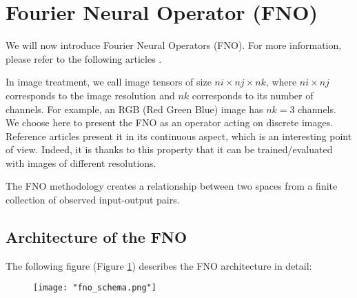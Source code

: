 \section{Fourier Neural Operator (FNO)} \label{FNO}
\graphicspath{{images/fourier}}


We will now introduce Fourier Neural Operators (FNO). For more information, please refer to the following articles .


In image treatment, we call image tensors of size $ni\times nj\times nk$, where $ni\times nj$ corresponds to the image resolution and $nk$ corresponds to its number of channels. For example, an RGB (Red Green Blue) image has $nk=3$ channels. 
We choose here to present the FNO as an operator acting on discrete images. Reference articles present it in its continuous aspect, which is an interesting point of view. Indeed, it is thanks to this property that it can be trained/evaluated with images of different resolutions.

The FNO methodology creates a relationship between two spaces from a finite collection of observed input-output pairs. 

\subsection{Architecture of the FNO}


The following figure (Figure \ref{FNO_schema}) describes the FNO architecture in detail:

\begin{figure}[H]
	\texttt{[image: "fno\_schema.png"]}
	\label{FNO_schema}
\end{figure}

